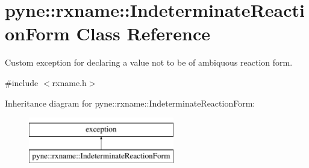 \hypertarget{classpyne_1_1rxname_1_1_indeterminate_reaction_form}{}\section{pyne\+:\+:rxname\+:\+:Indeterminate\+Reaction\+Form Class Reference}
\label{classpyne_1_1rxname_1_1_indeterminate_reaction_form}


Custom exception for declaring a value not to be of ambiquous reaction form.  




{\ttfamily \#include $<$rxname.\+h$>$}

Inheritance diagram for pyne\+:\+:rxname\+:\+:Indeterminate\+Reaction\+Form\+:\begin{figure}[H]
\begin{center}
\leavevmode
\includegraphics[height=2.000000cm]{classpyne_1_1rxname_1_1_indeterminate_reaction_form}
\end{center}
\end{figure}
